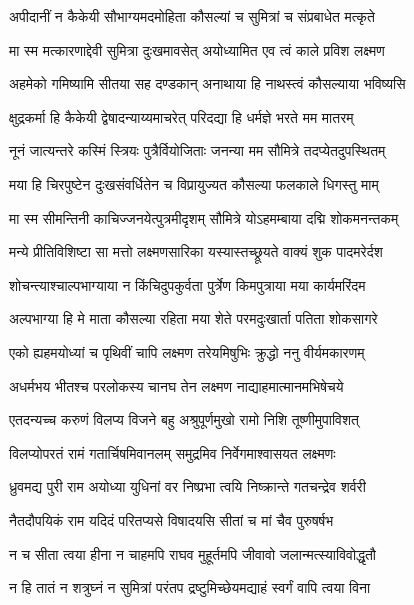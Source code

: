 \twolineshloka
{अपीदानीं न कैकेयी सौभाग्यमदमोहिता}
{कौसल्यां च सुमित्रां च संप्रबाधेत मत्कृते} %

\twolineshloka
{मा स्म मत्कारणाद्देवी सुमित्रा दुःखमावसेत्}
{अयोध्यामित एव त्वं काले प्रविश लक्ष्मण} %

\twolineshloka
{अहमेको गमिष्यामि सीतया सह दण्डकान्}
{अनाथाया हि नाथस्त्वं कौसल्याया भविष्यसि} %

\twolineshloka
{क्षुद्रकर्मा हि कैकेयी द्वेषादन्याय्यमाचरेत्}
{परिदद्या हि धर्मज्ञे भरते मम मातरम्} %

\twolineshloka
{नूनं जात्यन्तरे कस्मिं स्त्रियः पुत्रैर्वियोजिताः}
{जनन्या मम सौमित्रे तदप्येतदुपस्थितम्} %

\twolineshloka
{मया हि चिरपुष्टेन दुःखसंवर्धितेन च}
{विप्रायुज्यत कौसल्या फलकाले धिगस्तु माम्} %

\twolineshloka
{मा स्म सीमन्तिनी काचिज्जनयेत्पुत्रमीदृशम्}
{सौमित्रे योऽहमम्बाया दद्मि शोकमनन्तकम्} %

\twolineshloka
{मन्ये प्रीतिविशिष्टा सा मत्तो लक्ष्मणसारिका}
{यस्यास्तच्छ्रूयते वाक्यं शुक पादमरेर्दश} %

\twolineshloka
{शोचन्त्याश्चाल्पभाग्याया न किंचिदुपकुर्वता}
{पुर्त्रेण किमपुत्राया मया कार्यमरिंदम} %

\twolineshloka
{अल्पभाग्या हि मे माता कौसल्या रहिता मया}
{शेते परमदुःखार्ता पतिता शोकसागरे} %

\twolineshloka
{एको ह्यहमयोध्यां च पृथिवीं चापि लक्ष्मण}
{तरेयमिषुभिः क्रुद्धो ननु वीर्यमकारणम्} %

\twolineshloka
{अधर्मभय भीतश्च परलोकस्य चानघ}
{तेन लक्ष्मण नाद्याहमात्मानमभिषेचये} %

\twolineshloka
{एतदन्यच्च करुणं विलप्य विजने बहु}
{अश्रुपूर्णमुखो रामो निशि तूष्णीमुपाविशत्} %

\twolineshloka
{विलप्योपरतं रामं गतार्चिषमिवानलम्}
{समुद्रमिव निर्वेगमाश्वासयत लक्ष्मणः} %

\twolineshloka
{ध्रुवमद्य पुरी राम अयोध्या युधिनां वर}
{निष्प्रभा त्वयि निष्क्रान्ते गतचन्द्रेव शर्वरी} %

\twolineshloka
{नैतदौपयिकं राम यदिदं परितप्यसे}
{विषादयसि सीतां च मां चैव पुरुषर्षभ} %

\twolineshloka
{न च सीता त्वया हीना न चाहमपि राघव}
{मुहूर्तमपि जीवावो जलान्मत्स्याविवोद्धृतौ} %

\twolineshloka
{न हि तातं न शत्रुघ्नं न सुमित्रां परंतप}
{द्रष्टुमिच्छेयमद्याहं स्वर्गं वापि त्वया विना} %

